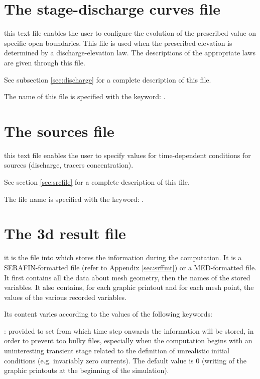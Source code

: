 \section{The stage-discharge curves file}

this text file enables the user to configure the evolution of the prescribed
value on specific open boundaries. This file is used when the prescribed
elevation is determined by a discharge-elevation law. The descriptions of the
appropriate laws are given through this file.

See subsection \ref{sec:discharge} for a complete description of this file.

The name of this file is specified with the keyword: .


\section{The sources file}

this text file enables the user to specify values for time-dependent conditions
for sources (discharge, tracers concentration).

See section \ref{sec:srcfile} for a complete description of this file.

The file name is specified with the keyword: .


\section{The 3d result file}
\label{sec:3dres}
it is the file into which  stores the information during the
computation. It is a SERAFIN-formatted file (refer to Appendix
\ref{sec:srffmt}) or a MED-formatted file. It first contains all the data about
mesh geometry, then the names of the stored variables. It also contains, for
each graphic printout and for each mesh point, the values of the various
recorded variables.

Its content varies according to the values of the following keywords:

: provided to set from
which time step onwards the information will be stored, in order to prevent too
bulky files, especially when the computation begins with an uninteresting
transient stage related to the definition of unrealistic initial conditions
(e.g. invariably zero currents). The default value is 0 (writing of the graphic
printouts at the beginning of the simulation).

